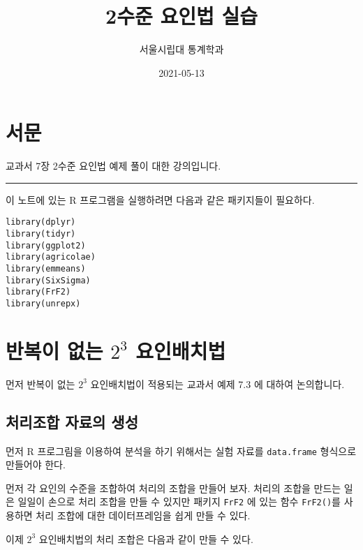 \documentclass[
]{book}
\title{2수준 요인법 실습}
\author{서울시립대 통계학과}
\date{2021-05-13}
\begin{document}
\maketitle

{
\setcounter{tocdepth}{1}
\tableofcontents
}
\hypertarget{uxc11cuxbb38}{%
\chapter*{서문}\label{uxc11cuxbb38}}


교과서 7장 2수준 요인법 예제 풀이 대한 강의입니다.

\begin{center}\rule{0.5\linewidth}{0.5pt}\end{center}

이 노트에 있는 R 프로그램을 실행하려면 다음과 같은 패키지들이 필요하다.

\begin{verbatim}
library(dplyr)
library(tidyr)
library(ggplot2)
library(agricolae)
library(emmeans)
library(SixSigma)
library(FrF2)
library(unrepx)
\end{verbatim}

\mainmatter

\hypertarget{threefactor}{%
\chapter{\texorpdfstring{반복이 없는 \(2^3\) 요인배치법}{반복이 없는 2\^{}3 요인배치법}}\label{threefactor}}

먼저 반복이 없는 \(2^3\) 요인배치법이 적용되는 교과서 예제 7.3 에 대하여 논의합니다.

\hypertarget{uxcc98uxb9acuxc870uxd569-uxc790uxb8ccuxc758-uxc0dduxc131}{%
\section{처리조합 자료의 생성}\label{uxcc98uxb9acuxc870uxd569-uxc790uxb8ccuxc758-uxc0dduxc131}}

먼저 R 프로그림을 이용하여 분석을 하기 위해서는 실험 자료를 \texttt{data.frame} 형식으로 만들어야 한다.

먼저 각 요인의 수준을 조합하여 처리의 조합을 만들어 보자. 처리의 조합을 만드는 일은 일일이 손으로
처리 조합을 만들 수 있지만 패키지 \texttt{FrF2} 에 있는 함수 \texttt{FrF2()}를 사용하면 처리 조합에 대한 데이터프레임을 쉽게 만들 수 있다.

이제 \(2^3\) 요인배치법의 처리 조합은 다음과 같이 만들 수 있다.
\end{document}
